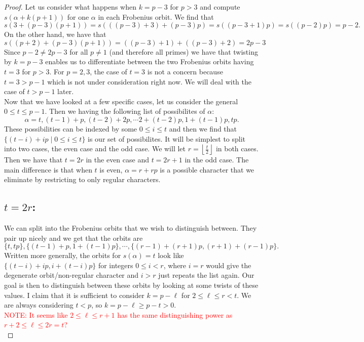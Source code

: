 \begin{proof}
Let us consider what happens when $k = p-3$ for $p > 3$ and compute $s(\alpha + k(p+1))$ for one $\alpha$ in each Frobenius orbit. 
We find that \[s(3 + (p-3)(p+1)) = s(((p-3)+3)+(p-3)p) = s((p-3+1)p) = s((p-2)p) = p-2.\] 
On the other hand, we have that \[s((p+2)+(p-3)(p+1)) = ((p-3)+1) + ((p-3)+2) =2p-3\]
Since $p-2 \neq 2p-3$ for all $p \neq 1$ (and therefore all primes) we have that twisting by $k = p-3$ enables us to differentiate between the two Frobenius orbits having $t = 3$ for $p > 3$. 
For $p = 2,3$, the case of $t = 3$ is not a concern because $t =3 > p-1$ which is not under consideration right now. 
We will deal with the case of $t > p-1$ later.
\\

Now that we have looked at a few specific cases, let us consider the general $0 \leq t \leq p-1$. 
Then we having the following list of possibilites of $\alpha$: \[\alpha = t, (t-1) + p, (t-2) +2 p, \cdots 2 + (t-2)p , 1 + (t-1)p, tp.\] 
These possibilities can be indexed by some $0 \leq i \leq t$ and then we find that $\{ (t-i) + i p \mid 0 \leq i \leq t\}$ is our set of possibilites. 
It will be simplest to split into two cases, the even case and the odd case.
We will let $r = \left\lfloor \frac{t}{2} \right\rfloor$ in both cases.
Then we have that $t = 2r$ in the even case and $t = 2r+1$ in the odd case.
The main difference is that when $t$ is even, $\alpha = r + rp$ is a possible character that we eliminate by restricting to only regular characters.

\subsection{$t = 2r$:}
We can split into the Frobenius orbits that we wish to distinguish between. 
They pair up nicely and we get that the orbits are \[\{t, tp\}, \{(t-1)+p, 1+(t-1)p\}, \cdots, \{(r-1) + (r+1) p, (r+1) + (r-1) p\}.\] 
Written more generally, the orbits for $s(\alpha) = t$ look like $\{(t-i) + ip, i + (t-i)p\}$ for integers $0 \leq i < r $, where $i=r$ would give the degenerate orbit/non-regular character and $i > r$ just repeats the list again. 
Our goal is then to distinguish between these orbits by looking at some twists of these values.
I claim that it is sufficient to consider $k = p - \ell$ for $2 \leq \ell \leq r < t$.
We are always considering $t < p$, so $k = p - \ell \geq p - t > 0$.
\\

\textcolor{red}{NOTE: It seems like $2 \leq \ell \leq r+1$ has the same distinguishing power as $r+2 \leq \ell \leq 2r=t$?}
\\


\end{proof}
